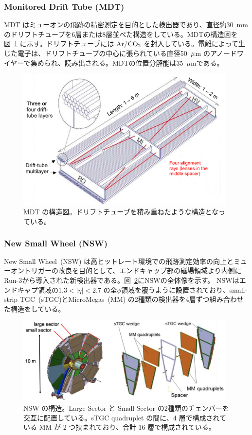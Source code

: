 \subsubsection{Monitored Drift Tube (MDT)}
MDT はミューオンの飛跡の精密測定を目的とした検出器であり、直径約30~mmのドリフトチューブを6層または8層並べた構造をしている。MDTの構造図を図~\ref{fig:MDT} に示す。ドリフトチューブには Ar/$\rm{CO_2}$ を封入している。電離によって生じた電子は、ドリフトチューブの中心に張られている直径50~$\rm{\mu}$m のアノードワイヤーで集められ、読み出される。MDTの位置分解能は35~$\mu$mである。

\begin{figure}[tb]
  \centering
  \includegraphics[clip, width=11cm]{fig/2/MDT_chamber_schematics_2.pdf}
  \caption{MDT の構造図\cite{Aad:1129811}。ドリフトチューブを積み重ねたような構造となっている。}
  \label{fig:MDT}
\end{figure}


\subsubsection{New Small Wheel (NSW)}
New Small Wheel~(NSW) は高ヒットレート環境での飛跡測定効率の向上とミューオントリガーの改良を目的として、エンドキャップ部の磁場領域より内側にRun-3から導入された新検出器である\cite{article:NSW_tech}。図~\ref{fig:NSW}にNSWの全体像を示す。
NSWはエンドキャプ領域の$1.3 < |\eta| < 2.7$ の全$\phi$領域を覆うように設置されており、small-strip TGC~(sTGC)とMicroMegas~(MM) の2種類の検出器を4層ずつ組み合わせた構造をしている。
\begin{figure}[tb]
  \centering
  \includegraphics[clip, width=11cm]{fig/2/nsw-structure.png}
  \caption{NSW の構造\cite{article:NSW}。Large Sector と Small Sector の2種類のチェンバーを交互に配置している。sTGC quadruplet の間に、4 層で構成されている MM が 2 つ挟まれており、合計 16 層で構成されている。}
  \label{fig:NSW}
\end{figure}

